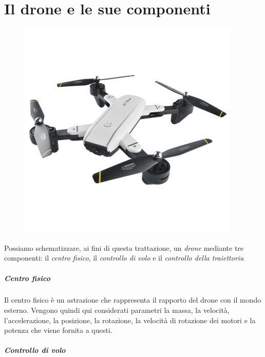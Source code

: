 \documentclass[11pt,a4paper]{report}
\newcommand{\emptypage}[0]{\afterpage{\null\newpage}}
\begin{document}

\emptypage

\chapter{Il drone e le sue componenti}

\begin{figure}[H]
\centering
\includegraphics[scale=0.5]{drone.jpg}
\end{figure}

Possiamo schematizzare, ai fini di questa trattazione, un \textit{drone} mediante tre componenti: il \textit{centro fisico}, il \textit{controllo di volo} e il \textit{controllo della traiettoria}



\paragraph{Centro fisico}

Il centro fisico è un astrazione che rappresenta il rapporto del drone con il mondo esterno. Vengono quindi qui considerati parametri la massa, la velocità, l'accelerazione, la posizione, la rotazione, la velocità di rotazione dei motori e la potenza che viene fornita a questi.

\paragraph{Controllo di volo}
\end{document}
